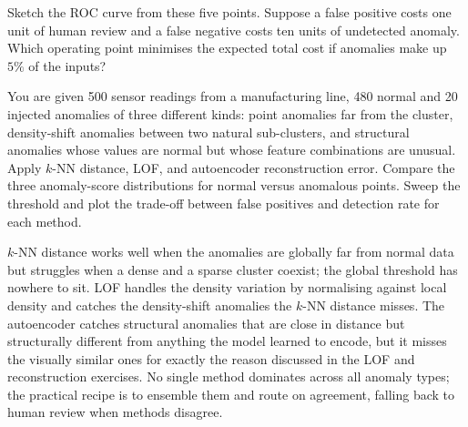 Sketch the ROC curve from these five points.
Suppose a false positive costs one unit of human review and a false negative costs ten units of undetected anomaly.
Which operating point minimises the expected total cost if anomalies make up $5\%$ of the inputs?


\vspace{2.5em}



You are given 500 sensor readings from a manufacturing line, 480 normal and 20 injected anomalies of three different kinds: point anomalies far from the cluster, density-shift anomalies between two natural sub-clusters, and structural anomalies whose values are normal but whose feature combinations are unusual.
Apply $k$-NN distance, LOF, and autoencoder reconstruction error.
Compare the three anomaly-score distributions for normal versus anomalous points.
Sweep the threshold and plot the trade-off between false positives and detection rate for each method.

$k$-NN distance works well when the anomalies are globally far from normal data but struggles when a dense and a sparse cluster coexist; the global threshold has nowhere to sit.
LOF handles the density variation by normalising against local density and catches the density-shift anomalies the $k$-NN distance misses.
The autoencoder catches structural anomalies that are close in distance but structurally different from anything the model learned to encode, but it misses the visually similar ones for exactly the reason discussed in the LOF and reconstruction exercises.
No single method dominates across all anomaly types; the practical recipe is to ensemble them and route on agreement, falling back to human review when methods disagree.

